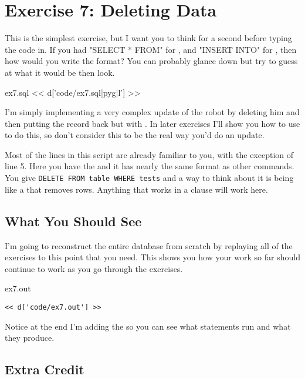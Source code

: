 \chapter{Exercise 7: Deleting Data}

This is the simplest exercise, but I want you to think for a second before
typing the code in.  If you had "SELECT * FROM" for , and
"INSERT INTO" for , then how would you write the 
format?  You can probably glance down but try to guess at what it would
be then look.

\begin{code}{ex7.sql}
<< d['code/ex7.sql|pyg|l'] >>
\end{code}

I'm simply implementing a very complex update of the robot by deleting 
him and then putting the record back but with .  In later
exercises I'll show you how to use  to do this, so don't
consider this to be the real way you'd do an update.

Most of the lines in this script are already familiar to you, with the
exception of line 5.  Here you have the  and it has
nearly the same format as other commands.  You give \verb|DELETE FROM table WHERE tests| and a way to think about it is being like a  that
removes rows.  Anything that works in a  clause will work here.

\section{What You Should See}

I'm going to reconstruct the entire database from scratch by replaying all of
the exercises to this point that you need.  This shows you how your work 
so far should continue to work as you go through the exercises.

\begin{code}{ex7.out}
\begin{Verbatim}
<< d['code/ex7.out'] >>
\end{Verbatim}
\end{code}

Notice at the end I'm adding the  so you can see
what statements run and what they produce.

\section{Extra Credit}

